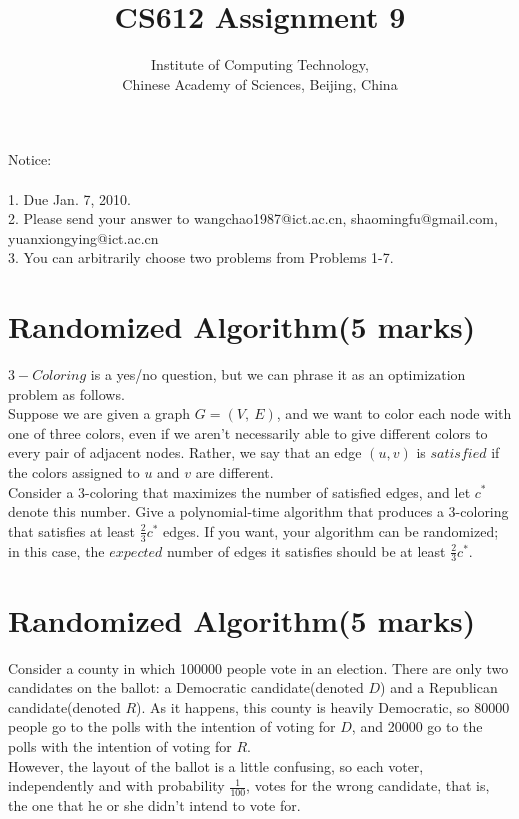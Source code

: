 \documentclass[a4paper,11pt]{article}
\title{CS612 Assignment 9}
\author{Institute of Computing Technology, \\
                       Chinese Academy of Sciences, Beijing, China }
\begin{document}
\maketitle

Notice:\\\\
1. Due Jan. 7, 2010.\\
2. Please send your answer to wangchao1987@ict.ac.cn, shaomingfu@gmail.com, yuanxiongying@ict.ac.cn\\
3. You can arbitrarily choose two problems from Problems 1-7.

\section{Randomized Algorithm(5 marks)}

$3-Coloring$ is a yes/no question, but we can phrase it as an optimization problem as follows.\\

	Suppose we are given a graph $G=(V,\ E)$, and we want to color each node with one of three colors, even if we aren't necessarily able to give different colors to every pair of adjacent nodes. Rather, we say that an edge $(u,v)$ is $satisfied$ if the colors assigned to $u$ and $v$ are different.\\

	Consider a 3-coloring that maximizes the number of satisfied edges, and let $c^*$ denote this number. Give a polynomial-time algorithm that produces a 3-coloring that satisfies at least $\frac{2}{3} c^*$ edges. If you want, your algorithm can be randomized; in this case, the $expected$ number of edges it satisfies should be at least $\frac{2}{3} c^*$.

\section{Randomized Algorithm(5 marks)}

Consider a county in which 100000 people vote in an election. There are only two candidates on the ballot: a Democratic candidate(denoted $D$) and a Republican candidate(denoted $R$). As it happens, this county is heavily Democratic, so 80000 people go to the polls with the intention of voting for $D$, and 20000 go to the polls with the intention of voting for $R$.\\

		 However, the layout of the ballot is a little confusing, so each voter, independently and with probability $\frac{1}{100}$, votes for the wrong candidate, that is, the one that he or she didn't intend to vote for.\\
\end{document}
